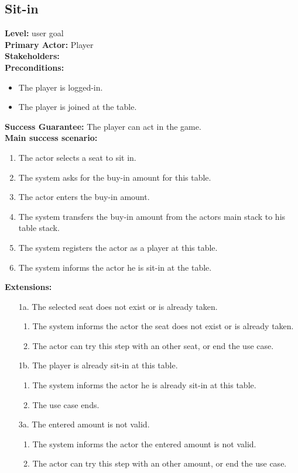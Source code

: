\documentclass[a4paper,11pt]{report}
\begin{document}
\subsection{Sit-in}
\textbf{Level:} user goal \\
\textbf{Primary Actor:} Player \\
\textbf{Stakeholders:} \\
\textbf{Preconditions:}
\begin{itemize}
\item The player is logged-in.
\item The player is joined at the table.
\end{itemize}
\textbf{Success Guarantee:} The player can act in the game.\\
\textbf{Main success scenario:} 
\begin{enumerate}
\item The actor selects a seat to sit in. 
\item The system asks for the buy-in amount for this table. 
\item The actor enters the buy-in amount. 
\item The system transfers the buy-in amount from the actors main stack to his table stack.
\item The system registers the actor as a player at this table. 
\item The system informs the actor he is sit-in at the table.
\end{enumerate}
\textbf{Extensions:}
\begin{itemize}
\item[1a.] The selected seat does not exist or is already taken.
\begin{enumerate}
\item The system informs the actor the seat does not exist or is already taken.
\item The actor can try this step with an other seat, or end the use case.
\end{enumerate}
\item[1b.] The player is already sit-in at this table.
\begin{enumerate}
\item The system informs the actor he is already sit-in at this table.
\item The use case ends.
\end{enumerate}
\item[3a.] The entered amount is not valid. 
\begin{enumerate}
\item The system informs the actor the entered amount is not valid.
\item The actor can try this step with an other amount, or end the use case.
\end{enumerate}
\end{itemize}
\end{document}
